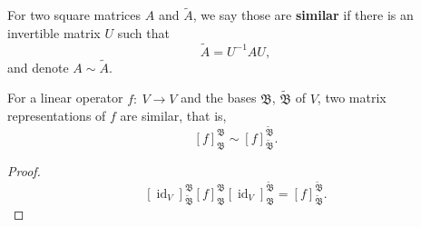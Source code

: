 \begin{ex}[similarity]
For two square matrices $A$ and $\tilde A$, we say those are \textbf{similar} if there is an invertible matrix $U$ such that $$\tilde A = U^{-1}AU,$$and denote $A\sim \tilde A$.
\end{ex}
\begin{prop}
[similarity]
For a linear operator $f:~V\to V$ and the bases $\mathfrak B$, $\tilde{\mathfrak B}$ of $V$, two matrix representations of $f$ are similar, that is, $$[f]^{\mathfrak B} _{\mathfrak B} \sim [f]^{\tilde{\mathfrak B}} _{\tilde{\mathfrak B}}.$$
\end{prop}
\begin{proof}
$$[\operatorname{id}_V] _{\tilde{\mathfrak B}} ^{\mathfrak B} [f]^{\mathfrak B} _{\mathfrak B} [\operatorname{id}_V] ^{\tilde{\mathfrak B}} _{\mathfrak B} = [f]^{\tilde{\mathfrak B}} _{\tilde{\mathfrak B}}.$$
\end{proof}
